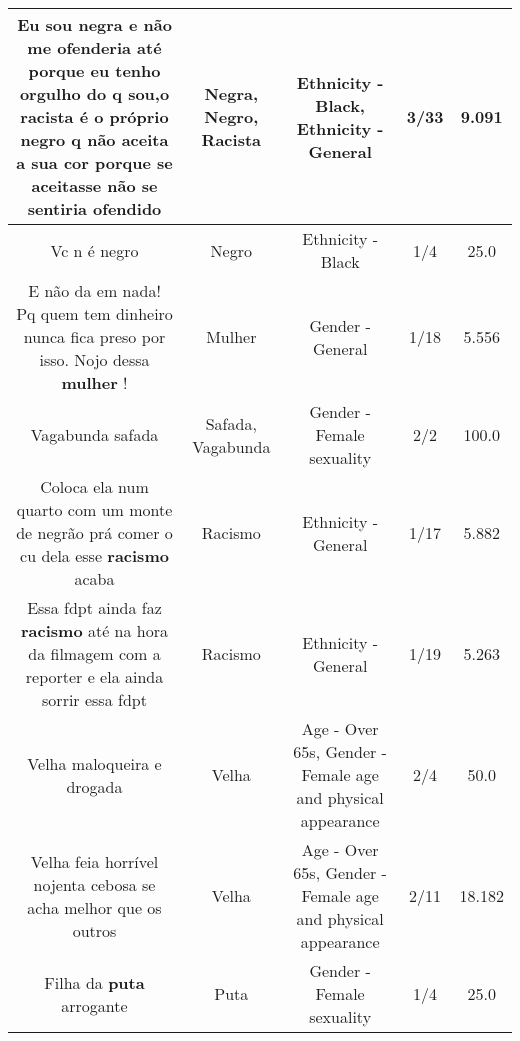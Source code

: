 \documentclass[11pt]{article}
\newlength\mylength
\begin{document}
\begin{center}
\begin{longtable}{|C{.65\mylength}|C{.30\mylength}|C{.12\mylength}|C{.12\mylength}|C{.12\mylength}|}
  \small Eu sou \textbf{negra} e não me ofenderia até porque eu tenho orgulho do q sou,o \textbf{racista} é o próprio \textbf{negro} q não aceita a sua cor porque se aceitasse não se sentiria ofendido\normalsize   & Negra, Negro, Racista & Ethnicity - Black, Ethnicity - General & 3/33 & 9.091 \\  \hline
  \small Vc n é negro\normalsize   & Negro & Ethnicity - Black & 1/4 & 25.0 \\  \hline
  \small E não da em nada! Pq quem tem dinheiro nunca fica preso por isso. Nojo dessa \textbf{mulher} !\normalsize   & Mulher & Gender - General & 1/18 & 5.556 \\  \hline
  \small Vagabunda safada\normalsize   & Safada, Vagabunda & Gender - Female sexuality & 2/2 & 100.0 \\  \hline
  \small Coloca ela num quarto com um monte de negrão prá comer o cu dela esse \textbf{racismo} acaba\normalsize   & Racismo & Ethnicity - General & 1/17 & 5.882 \\  \hline
  \small Essa fdpt ainda faz \textbf{racismo} até na hora da filmagem com a reporter e ela ainda sorrir essa fdpt\normalsize   & Racismo & Ethnicity - General & 1/19 & 5.263 \\  \hline
  \small Velha maloqueira e drogada\normalsize   & Velha & Age - Over 65s, Gender - Female age and physical appearance & 2/4 & 50.0 \\  \hline
  \small Velha feia horrível nojenta cebosa se acha melhor que os outros\normalsize   & Velha & Age - Over 65s, Gender - Female age and physical appearance & 2/11 & 18.182 \\  \hline
  \small Filha da \textbf{puta} arrogante\normalsize   & Puta & Gender - Female sexuality & 1/4 & 25.0 \\  \hline

\end{longtable}
\end{center}
\end{document}
